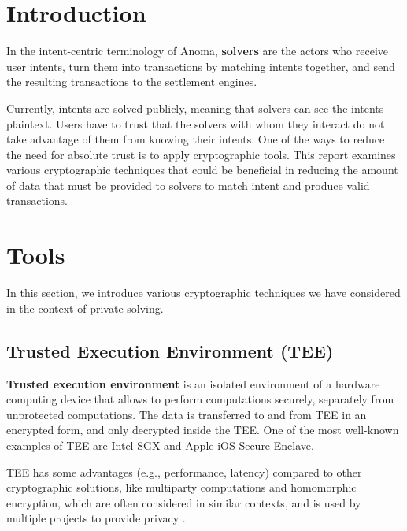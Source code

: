 \documentclass[
    9pt,            %
    report,        %
    affiltop,       %
]{art}
\begin{document}
\maketitle

\section{Introduction}

In the intent-centric terminology of Anoma, \textbf{solvers} are the actors who receive user intents, turn them into transactions by matching intents together, and send the resulting transactions to the settlement engines. 

Currently, intents are solved publicly, meaning that solvers can see the intents plaintext. Users have to trust that the solvers with whom they interact do not take advantage of them from knowing their intents. One of the ways to reduce the need for absolute trust is to apply cryptographic tools. This report examines various cryptographic techniques that could be beneficial in reducing the amount of data that must be provided to solvers to match intent and produce valid transactions.

\section{Tools}

In this section, we introduce various cryptographic techniques we have considered in the context of private solving. 

\subsection{Trusted Execution Environment (TEE)}\label{TEE}

\textbf{Trusted execution environment} is an isolated environment of a hardware computing device that allows to perform computations securely, separately from unprotected computations. The data is transferred to and from TEE in an encrypted form, and only decrypted inside the TEE. One of the most well-known examples of TEE are Intel SGX and Apple iOS Secure Enclave. 

TEE has some advantages (e.g., performance, latency) compared to other cryptographic solutions, like multiparty computations and homomorphic encryption, which are often considered in similar contexts, and is used by multiple projects to provide privacy \citep{flash,secret}.
\end{document}
